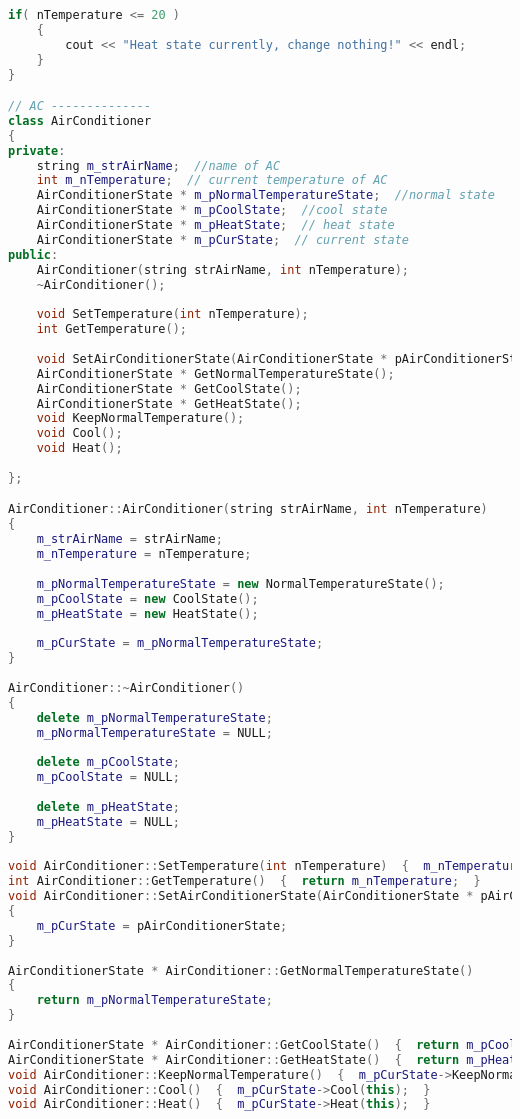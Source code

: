 \documentclass{book}
\begin{document}
\begin{lstlisting}[caption={State Pattern exmaple 1}, language=C++]
    if( nTemperature <= 20 )  
    {  
        cout << "Heat state currently, change nothing!" << endl;  
    }  
}  

// AC --------------
class AirConditioner  
{  
private:  
    string m_strAirName;  //name of AC
    int m_nTemperature;  // current temperature of AC
    AirConditionerState * m_pNormalTemperatureState;  //normal state
    AirConditionerState * m_pCoolState;  //cool state
    AirConditionerState * m_pHeatState;  // heat state
    AirConditionerState * m_pCurState;  // current state
public:  
    AirConditioner(string strAirName, int nTemperature);  
    ~AirConditioner();  
      
    void SetTemperature(int nTemperature);  
    int GetTemperature();  
  
    void SetAirConditionerState(AirConditionerState * pAirConditionerState);  
    AirConditionerState * GetNormalTemperatureState();  
    AirConditionerState * GetCoolState();  
    AirConditionerState * GetHeatState();  
    void KeepNormalTemperature();  
    void Cool();  
    void Heat();  
      
};  

AirConditioner::AirConditioner(string strAirName, int nTemperature)  
{  
    m_strAirName = strAirName;  
    m_nTemperature = nTemperature;  
  
    m_pNormalTemperatureState = new NormalTemperatureState();  
    m_pCoolState = new CoolState();  
    m_pHeatState = new HeatState();  
  
    m_pCurState = m_pNormalTemperatureState;  
}  
  
AirConditioner::~AirConditioner()  
{  
    delete m_pNormalTemperatureState;  
    m_pNormalTemperatureState = NULL;  
  
    delete m_pCoolState;  
    m_pCoolState = NULL;  
  
    delete m_pHeatState;  
    m_pHeatState = NULL;  
}  
      
void AirConditioner::SetTemperature(int nTemperature)  {  m_nTemperature = nTemperature;  }  
int AirConditioner::GetTemperature()  {  return m_nTemperature;  }  
void AirConditioner::SetAirConditionerState(AirConditionerState * pAirConditionerState)  
{  
    m_pCurState = pAirConditionerState;  
}  
  
AirConditionerState * AirConditioner::GetNormalTemperatureState()  
{  
    return m_pNormalTemperatureState;  
}  
  
AirConditionerState * AirConditioner::GetCoolState()  {  return m_pCoolState;  }  
AirConditionerState * AirConditioner::GetHeatState()  {  return m_pHeatState;  }  
void AirConditioner::KeepNormalTemperature()  {  m_pCurState->KeepNormalTemperature(this);  }  
void AirConditioner::Cool()  {  m_pCurState->Cool(this);  }  
void AirConditioner::Heat()  {  m_pCurState->Heat(this);  }  


\end{lstlisting}
\end{document}
